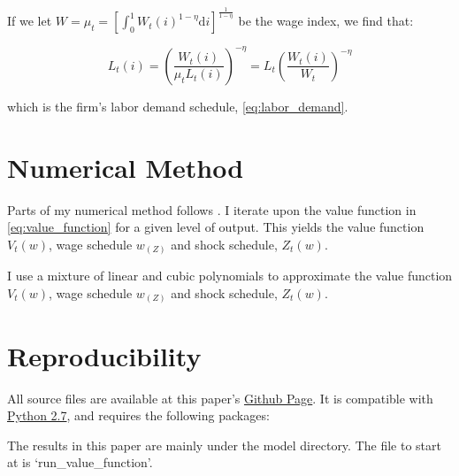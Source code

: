 \documentclass[12pt,a4paper]{scrartcl}            %
\begin{document}
If we let $W = \mu_t = \left[ \int_{0}^{1} \! W_t(i)^{1 - \eta} \mathrm{d}i \right]^{\frac{1}{1 - \eta}}$ be the wage index, we find that:

\begin{equation}
    \label{eqa:firms_foc3}
    L_t(i) = \left(\frac{W_t(i)}{\mu_t L_t(i)}\right)^{-\eta} = L_t \left( \frac{W_t(i)}{W_t} \right)^{-\eta}
\end{equation}

which is the firm's labor demand schedule, \eqref{eq:labor_demand}.
\section{Numerical Method}

Parts of my numerical method follows \cite{daly_hobijn_2013}.
I iterate upon the value function in \eqref{eq:value_function} for a given level of output.
This yields the value function $V_t(w)$, wage schedule $w_(Z)$ and shock schedule, $Z_t(w)$.

I use a mixture of linear and cubic polynomials to approximate the value function $V_t(w)$, wage schedule $w_(Z)$ and shock schedule, $Z_t(w)$.


\section{Reproducibility}

All source files are available at this paper's \href{https://github.com/tomAugspurger/dnwr-zlb}{Github Page}.
It is compatible with \href{http://python.org/download/releases/2.7.5/}{Python 2.7}, and requires the following packages:


The results in this paper are mainly under the model directory.
The file to start at is `run\_value\_function'.
\end{document}
